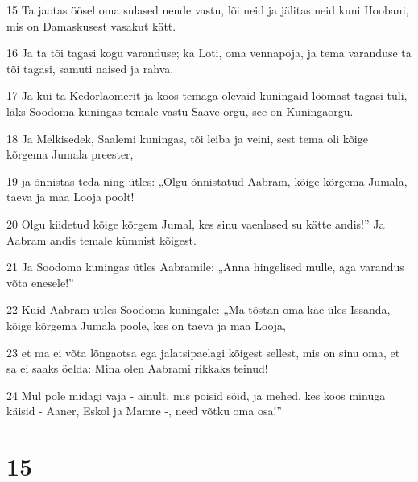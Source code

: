 \par 15 Ta jaotas öösel oma sulased nende vastu, lõi neid ja jälitas neid kuni Hoobani, mis on Damaskusest vasakut kätt.
\par 16 Ja ta tõi tagasi kogu varanduse; ka Loti, oma vennapoja, ja tema varanduse ta tõi tagasi, samuti naised ja rahva.
\par 17 Ja kui ta Kedorlaomerit ja koos temaga olevaid kuningaid löömast tagasi tuli, läks Soodoma kuningas temale vastu Saave orgu, see on Kuningaorgu.
\par 18 Ja Melkisedek, Saalemi kuningas, tõi leiba ja veini, sest tema oli kõige kõrgema Jumala preester,
\par 19 ja õnnistas teda ning ütles: „Olgu õnnistatud Aabram, kõige kõrgema Jumala, taeva ja maa Looja poolt!
\par 20 Olgu kiidetud kõige kõrgem Jumal, kes sinu vaenlased su kätte andis!” Ja Aabram andis temale kümnist kõigest.
\par 21 Ja Soodoma kuningas ütles Aabramile: „Anna hingelised mulle, aga varandus võta enesele!”
\par 22 Kuid Aabram ütles Soodoma kuningale: „Ma tõstan oma käe üles Issanda, kõige kõrgema Jumala poole, kes on taeva ja maa Looja,
\par 23 et ma ei võta lõngaotsa ega jalatsipaelagi kõigest sellest, mis on sinu oma, et sa ei saaks öelda: Mina olen Aabrami rikkaks teinud!
\par 24 Mul pole midagi vaja - ainult, mis poisid sõid, ja mehed, kes koos minuga käisid - Aaner, Eskol ja Mamre -, need võtku oma osa!”

\chapter{15}

